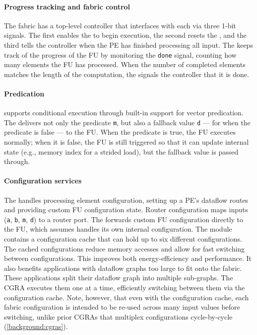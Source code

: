 \paragraph{Progress tracking and fabric control}
The fabric has a top-level controller that interfaces with each \ucore via three 1-bit signals.
% 
The first enables the \ucore to begin execution, the second resets the \ucore, and the third tells the controller when the PE has finished processing all input.
% 
The \ucore keeps track of the progress of the FU by monitoring the {\tt done} signal,
%
counting how many elements the FU has processed.
% 
When the number of completed elements matches the length of the computation, the \ucore signals the controller that it is done.

\paragraph{Predication}
\snafuframe supports conditional execution through built-in support for vector predication.
% 
The \ucore delivers not only the predicate {\tt m}, but also a fallback value {\tt d} --- for when the predicate is false --- to the FU.
% 
When the predicate is true, the FU executes normally; when it is false, the FU is still triggered so that it can update internal state (e.g., memory index for a strided load), but the fallback value is passed through.

\paragraph{Configuration services}
\label{snafu:flexible:config}
The \ucfg handles processing element configuration, setting up a PE's dataflow
routes and providing custom FU configuration state.
%
Router configuration maps inputs ({\tt a}, {\tt b}, {\tt m}, {\tt d}) to a router port.
%
The \ucfg forwards custom FU configuration directly to the FU, which
\snafuframe assumes handles its own internal configuration.
% 
The \ucfg module contains a configuration cache that can hold up to six different configurations.
%
The cached configurations reduce memory accesses and allow for fast switching between configurations.
% 
This improves both energy-efficiency and performance. %
% 
It also benefits applications with dataflow graphs too large to fit onto the fabric.
% 
These applications split their dataflow graph into multiple sub-graphs.
% 
The CGRA executes them one at a time, efficiently switching between them via the configuration cache.
%
Note, however, that even with the configuration cache, each fabric configuration is intended to be re-used across many input values before switching,
unlike prior CGRAs that multiplex configurations cycle-by-cycle (\autoref{background:cgras}).

